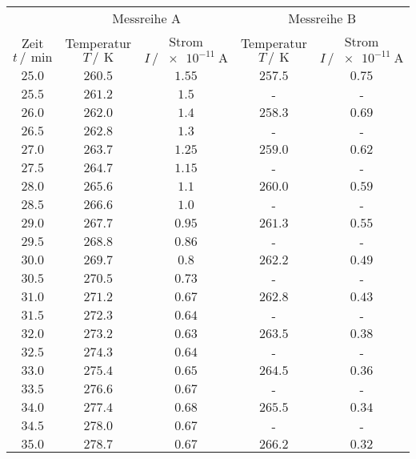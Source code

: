 \begin{table}
    \centering
    \begin{tabular}{c c c c c}
        \toprule
&\multicolumn{2}{c}{Messreihe A}&\multicolumn{2}{c}{Messreihe B}\\
Zeit $t \,/\,\SI{}{\minute}$&Temperatur $T \,/\,\SI{}{\kelvin}$ &Strom $I \,/\,\SI{e-11}{\ampere}$&Temperatur $T \,/\,\SI{}{\kelvin}$ &Strom $I \,/\,\SI{e-11}{\ampere}$\\
\midrule
        $\num{25.0}$&$\num{260.5}$&$\num{1.55}$&$\num{257.5}$&$\num{0.75}$\\
        $\num{25.5}$&$\num{261.2}$&$\num{1.5}$&-&-\\
        $\num{26.0}$&$\num{262.0}$&$\num{1.4}$&$\num{258.3}$&$\num{0.69}$\\
        $\num{26.5}$&$\num{262.8}$&$\num{1.3}$&-&-\\
        $\num{27.0}$&$\num{263.7}$&$\num{1.25}$&$\num{259.0}$&$\num{0.62}$\\
        $\num{27.5}$&$\num{264.7}$&$\num{1.15}$&-&-\\
        $\num{28.0}$&$\num{265.6}$&$\num{1.1}$&$\num{260.0}$&$\num{0.59}$\\
        $\num{28.5}$&$\num{266.6}$&$\num{1.0}$&-&-\\
        $\num{29.0}$&$\num{267.7}$&$\num{0.95}$&$\num{261.3}$&$\num{0.55}$\\
        $\num{29.5}$&$\num{268.8}$&$\num{0.86}$&-&-\\
        $\num{30.0}$&$\num{269.7}$&$\num{0.8}$&$\num{262.2}$&$\num{0.49}$\\
        $\num{30.5}$&$\num{270.5}$&$\num{0.73}$&-&-\\
        $\num{31.0}$&$\num{271.2}$&$\num{0.67}$&$\num{262.8}$&$\num{0.43}$\\
        $\num{31.5}$&$\num{272.3}$&$\num{0.64}$&-&-\\
        $\num{32.0}$&$\num{273.2}$&$\num{0.63}$&$\num{263.5}$&$\num{0.38}$\\
        $\num{32.5}$&$\num{274.3}$&$\num{0.64}$&-&-\\
        $\num{33.0}$&$\num{275.4}$&$\num{0.65}$&$\num{264.5}$&$\num{0.36}$\\
        $\num{33.5}$&$\num{276.6}$&$\num{0.67}$&-&-\\
        $\num{34.0}$&$\num{277.4}$&$\num{0.68}$&$\num{265.5}$&$\num{0.34}$\\
        $\num{34.5}$&$\num{278.0}$&$\num{0.67}$&-&-\\
        $\num{35.0}$&$\num{278.7}$&$\num{0.67}$&$\num{266.2}$&$\num{0.32}$\\

\end{tabular}
\end{table}

